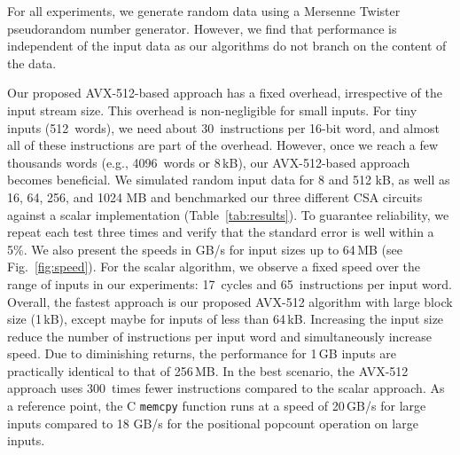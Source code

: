 \documentclass[AMA,STIX1COL]{WileyNJD-v2}
\begin{document}
For all experiments, we generate random data using a Mersenne Twister pseudorandom number generator. However, we find that performance is independent of the input data as our algorithms do not branch on the content of the data.

Our proposed AVX-512-based approach has a fixed overhead, irrespective of the input stream size. This overhead is non-negligible for small inputs. For tiny inputs (512~words), we need about 30~instructions per 16-bit word, and almost all of these instructions are part of the overhead. However, once we reach a few thousands words (e.g., 4096~words or 8\,kB), our  AVX-512-based approach becomes beneficial. We simulated random input data for 8 and 512 kB, as well as 16, 64, 256, and 1024 MB and benchmarked our three different CSA circuits against a scalar implementation (Table~\ref{tab:results}). To guarantee reliability, we repeat each test three times and verify that the standard error is well within a 5\%. 
We also present the speeds in GB/s for input sizes up to 64\,MB (see Fig.~\ref{fig:speed}).
For the scalar algorithm, we observe a fixed speed over the range of inputs in our experiments: 17~cycles and 65~instructions per input word.  
Overall, the fastest approach is our proposed AVX-512 algorithm with large block size (1\,kB), except maybe for inputs of less than 64\,kB. Increasing the input size reduce the number of instructions per input word and simultaneously increase speed. Due to diminishing returns, the performance for 1\,GB inputs are practically identical to that of 256\,MB. In the best scenario, the AVX-512 approach uses 300~times fewer instructions compared to the scalar approach. As a reference point, the C \texttt{memcpy} function runs at a speed of 20\,GB/s for large inputs compared to 18 GB/s for the positional popcount operation on large inputs.
\end{document}
